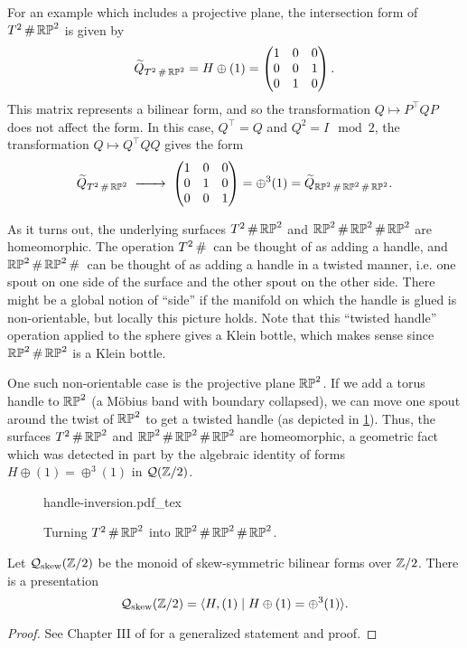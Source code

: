 \begin{example}
	For an example which includes a projective plane, the intersection form of $T^2\+ \RP^2$ is given by
	\[
		\widetilde{Q}_{T^2\+ \RP^2} = H\oplus (1)=
		\begin{pmatrix}
			1 & 0 & 0 \\
			0 & 0 & 1 \\
			0 & 1 & 0
		\end{pmatrix}.
	\]
	This matrix represents a bilinear form, and so the transformation $Q\mapsto P^\intercal Q P$ does not affect the form. In this case, $Q^\intercal =Q$ and $Q^2=I\mod 2$, the transformation $Q\mapsto Q^\intercal Q Q$ gives the form
	\[
		\widetilde{Q}_{T^2\+ \RP^2}
		\lkxto \begin{pmatrix}
			1 & 0 & 0 \\
			0 & 1 & 0 \\
			0 & 0 & 1
		\end{pmatrix} =\oplus^3(1)= \widetilde{Q}_{\RP^2\+\RP^2\+\RP^2}.
	\]
\end{example}
As it turns out, the underlying surfaces $T^2\+\RP^2$ and $\RP^2\+\RP^2\+\RP^2$ are homeomorphic. The operation $T^2\+$ can be thought of as adding a handle, and $\RP^2\+\RP^2\+$ can be thought of as adding a handle in a twisted manner, i.e. one spout on one side of the surface and the other spout on the other side. 
There might be a global notion of ``side'' if the manifold on which the handle is glued is non-orientable, but locally this picture holds.
Note that this ``twisted handle'' operation applied to the sphere gives a Klein bottle, which makes sense since $\RP^2\+\RP^2$ is a Klein bottle.

One such non-orientable case is the projective plane $\mathbb{RP}^2$. If we add a torus handle to $\mathbb{RP}^2$ (a M\"obius band with boundary collapsed), we can move one spout around the twist of $\mathbb{RP}^2$ to get a twisted handle (as depicted in \cref{fig:twisted-handle-to-handle}). Thus, the surfaces $T^2\+\RP^2$ and $\RP^2\+\RP^2\+\RP^2$ are homeomorphic, a geometric fact which was detected in part by the algebraic identity of forms $H\oplus (1)=\oplus^3(1)$ in $\mathcal{Q}(\mathbb{Z}/2)$.

\begin{figure}[ht]
	\centering
	{handle-inversion.pdf_tex}
	\caption{Turning $T^2\+\RP^2$ into $\RP^2\+\RP^2\+\RP^2$.}\label{fig:twisted-handle-to-handle}
\end{figure}

\begin{proposition}
	Let $\mathcal{Q}_{\mathrm{skew}}(\mathbb{Z}/2)$ be the monoid of skew-symmetric bilinear forms over $\mathbb{Z}/2$. There is a presentation
	\[\mathcal{Q}_{\mathrm{skew}}(\mathbb{Z}/2) = \langle H, (1) \mid H\oplus (1) = \oplus^3 (1)\rangle.\]
\end{proposition}
\begin{proof}
	See Chapter III of \cite{milnorhuse1973forms} for a generalized statement and proof.
\end{proof}

